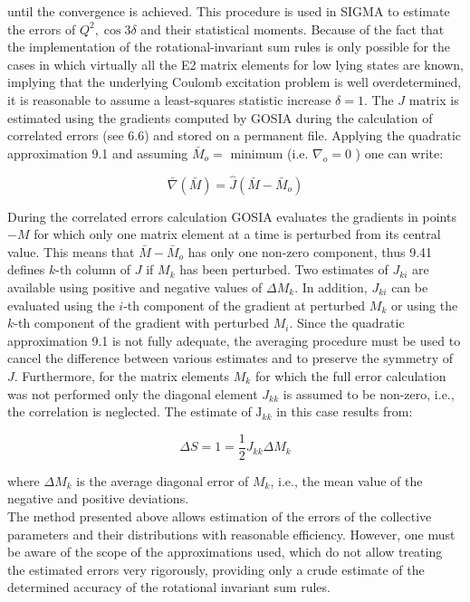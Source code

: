 \documentclass[10pt]{article}
\begin{document}
until the convergence is achieved. This procedure is used in SIGMA to estimate the errors of $Q^{2}, \cos 3 \delta$ and their statistical moments. Because of the fact that the implementation of the rotational-invariant sum rules is only possible for the cases in which virtually all the E2 matrix elements for low lying states are known, implying that the underlying Coulomb excitation problem is well overdetermined, it is reasonable to assume a least-squares statistic increase $\delta=1$. The $J$ matrix is estimated using the gradients computed by GOSIA during the calculation of correlated errors (see 6.6) and stored on a permanent file. Applying the quadratic approximation 9.1 and assuming $\bar{M}_{o}=$ minimum (i.e. $\nabla_{o}=0$ ) one can write:


\begin{equation*}
\bar{\nabla}(\bar{M})=\hat{J}\left(\bar{M}-\bar{M}_{o}\right) \tag{9.41}
\end{equation*}


During the correlated errors calculation GOSIA evaluates the gradients in points $-M$ for which only one matrix element at a time is perturbed from its central value. This means that $\bar{M}-\bar{M}_{o}$ has only one non-zero component, thus 9.41 defines $k$-th column of $J$ if $M_{k}$ has been perturbed. Two estimates of $J_{k i}$ are available using positive and negative values of $\Delta M_{k}$. In addition, $J_{k i}$ can be evaluated using the $i$-th component of the gradient at perturbed $M_{k}$ or using the $k$-th component of the gradient with perturbed $M_{i}$. Since the quadratic approximation 9.1 is not fully adequate, the averaging procedure must be used to cancel the difference between various estimates and to preserve the symmetry of $J$. Furthermore, for the matrix elements $M_{k}$ for which the full error calculation was not performed only the diagonal element $J_{k k}$ is assumed to be non-zero, i.e., the correlation is neglected. The estimate of $\mathrm{J}_{k k}$ in this case results from:


\begin{equation*}
\Delta S=1=\frac{1}{2} J_{k k} \Delta M_{k} \tag{9.42}
\end{equation*}


where $\Delta M_{k}$ is the average diagonal error of $M_{k}$, i.e., the mean value of the negative and positive deviations.\\
The method presented above allows estimation of the errors of the collective parameters and their distributions with reasonable efficiency. However, one must be aware of the scope of the approximations used, which do not allow treating the estimated errors very rigorously, providing only a crude estimate of the determined accuracy of the rotational invariant sum rules.
\end{document}
